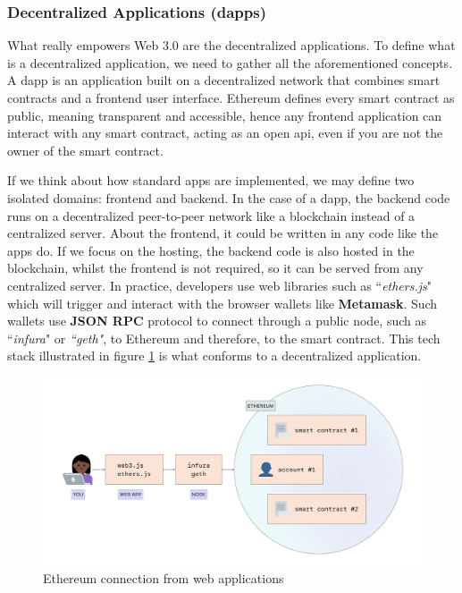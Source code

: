 \subsubsection{Decentralized Applications (dapps)}
{
What really empowers Web 3.0 are the decentralized applications. To define what is a decentralized application, we need to gather all the aforementioned concepts. A dapp is an application built on a decentralized network that combines smart contracts and a frontend user interface. Ethereum defines every smart contract as public, meaning transparent and accessible, hence any frontend application can interact with any smart contract, acting as an open \Gls{api}, even if you are not the owner of the smart contract.

If we think about how standard apps are implemented, we may define two isolated domains: frontend and backend. In the case of a dapp, the backend code runs on a decentralized peer-to-peer network like a blockchain instead of a centralized server. About the frontend, it could be written in any code like the apps do. If we focus on the hosting, the backend code is also hosted in the blockchain, whilst the frontend is not required, so it can be served from any centralized server. In practice, developers use web libraries such as ``\textit{ethers.js}"\cite{ethers} which will trigger and interact with the browser wallets like \textbf{Metamask}. Such wallets use \textbf{JSON RPC} protocol to connect through a public node, such as ``\textit{infura}"\cite{infura} or \textit{``geth"}\cite{geth}, to Ethereum and therefore, to the smart contract. This tech stack illustrated in figure \ref{fig:ethereum-node} is what conforms to a decentralized application.
}

\begin{figure}[H]
\centering
\includegraphics[width=14cm]{img/ethereum/nodes.png}
\caption[Ethereum connection from web applications]{\footnotesize{Ethereum connection from web applications}}
\label{fig:ethereum-node}
\end{figure}

